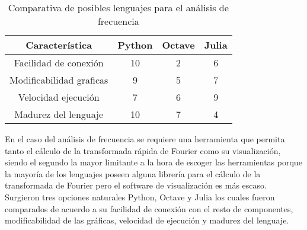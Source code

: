     \begin{table}[ht]
        \caption[Comparativa de posibles lenguajes para el análisis de frecuencia]{Comparativa de posibles lenguajes para el análisis de frecuencia}
        \label{tab:LenguajesServidor}
        \begin{center}
            \vspace{0.3cm}
            \begin{tabular}{|c|c|c|c|}
                \hline
                Característica              & Python & Octave & Julia\\\hline
                Facilidad de conexión       & 10    & 2     & 6 \\\hline
                Modificabilidad graficas    & 9     & 5     & 7 \\\hline
                Velocidad ejecución         & 7     & 6     & 9 \\\hline
                Madurez del lenguaje        & 10    & 7     & 4 \\\hline
                \hline
            \end{tabular}
        \end{center}
    \end{table}

    En el caso del análisis de frecuencia se requiere una herramienta que
    permita tanto el cálculo de la transformada rápida de Fourier como su
    visualización, siendo el segundo la mayor limitante a la hora de escoger
    las herramientas porque la mayoría de los lenguajes poseen alguna librería
    para el cálculo de la transformada de Fourier pero el software de
    visualización es más escaso. Surgieron tres opciones naturales Python,
    Octave y Julia los cuales fueron comparados de acuerdo a su facilidad de
    conexión con el resto de componentes, modificabilidad de las gráficas,
    velocidad de ejecución y madurez del lenguaje.
